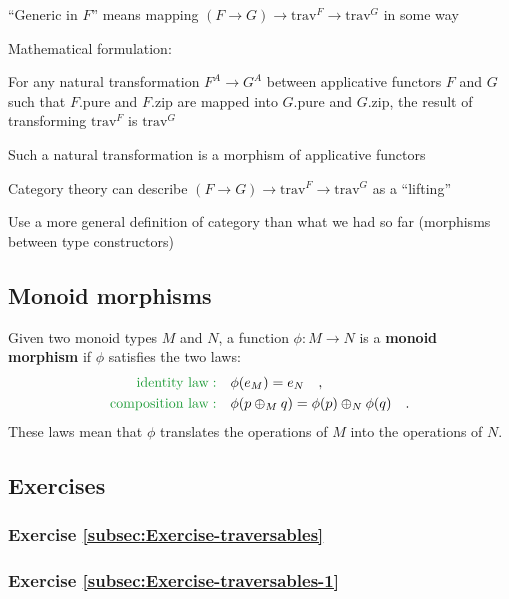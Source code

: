 \textsf{``}Generic in $F$\textsf{''} means mapping {\footnotesize{}$\left(F\rightarrow G\right)\rightarrow\text{trav}^{F}\rightarrow\text{trav}^{G}$}
in some way

Mathematical formulation:

For any natural transformation $F^{A}\rightarrow G^{A}$ between applicative
functors $F$ and $G$ such that $F.\text{pure}$ and $F.\text{zip}$
are mapped into $G.\text{pure}$ and $G.\text{zip}$, the result of
transforming $\text{trav}^{F}$ is $\text{trav}^{G}$

Such a natural transformation is a morphism of applicative functors

Category theory can describe {\footnotesize{}$\left(F\rightarrow G\right)\rightarrow\text{trav}^{F}\rightarrow\text{trav}^{G}$}
as a \textsf{``}lifting\textsf{''}

Use a more general definition of category than what we had so far
(morphisms between type constructors)

\subsection{Monoid morphisms}

Given two monoid types $M$ and $N$, a function $\phi:M\rightarrow N$
is a \textbf{monoid morphism} if $\phi$ satisfies
the two laws:
\begin{align*}
{\color{greenunder}\text{identity law}:}\quad & \phi(e_{M})=e_{N}\quad,\\
{\color{greenunder}\text{composition law}:}\quad & \phi(p\oplus_{M}q)=\phi(p)\oplus_{N}\phi(q)\quad.
\end{align*}
These laws mean that $\phi$ translates the operations of $M$ into
the operations of $N$.

\subsection{Exercises}

\subsubsection{Exercise \label{subsec:Exercise-traversables}\ref{subsec:Exercise-traversables}}

\subsubsection{Exercise \label{subsec:Exercise-traversables-1}\ref{subsec:Exercise-traversables-1}}

